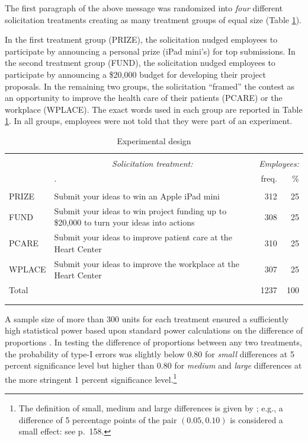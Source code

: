 \documentclass[12pt, titlepage]{article}
\begin{document}
The first paragraph of the above message was randomized into \emph{four}
different solicitation treatments creating as many treatment groups of
equal size (Table \ref{experimental-design}).

In the first treatment group (PRIZE), the solicitation nudged employees
to participate by announcing a personal prize (iPad mini's) for top
submissions. In the second treatment group (FUND), the solicitation
nudged employees to participate by announcing a \$20,000 budget for
developing their project proposals. In the remaining two groups, the
solicitation ``framed'' the contest as an opportunity to improve the
health care of their patients (PCARE) or the workplace (WPLACE). The
exact words used in each group are reported in Table
\ref{experimental-design}. In all groups, employees were not told that
they were part of an experiment.

\begin{table}
\centering
\caption{Experimental design}
\label{experimental-design}
\begin{tabular}{@{}lp{5cm}rr}
  \\[-1.8ex]\hline \hline \\[-1.8ex]
 & \multicolumn{1}{c}{\emph{Solicitation treatment:}}
                        & \multicolumn{2}{c}{\emph{Employees:}}\\
                        \cmidrule(lr){2-2}\cmidrule(lr){3-4} & . & freq. & \% \\ 
  \hline \\[-1.86ex]
PRIZE & Submit your ideas to win an Apple iPad mini & 312 & 25 \\ 
  [1.8ex] FUND & Submit your ideas to win project funding up to \$20,000 
            to turn your ideas into actions & 308 & 25 \\ 
  [1.8ex] PCARE & Submit your ideas to improve patient care at the Heart Center & 310 & 25 \\ 
  [1.8ex] WPLACE & Submit your ideas to improve the workplace at the Heart Center & 307 & 25 \\ 
  [1.8ex] Total &  & 1237 & 100 \\ 
   \\[-1.8ex]\hline \hline \\[-1.8ex]
\end{tabular}
\end{table}

A sample size of more than 300 units for each treatment ensured a
sufficiently high statistical power based upon standard power
calculations on the difference of proportions \citep{cohen1992power}. In
testing the difference of proportions between any two treatments, the
probability of type-I errors was slightly below \(0.80\) for
\emph{small} differences at 5 percent significance level but higher than
\(0.80\) for \emph{medium} and \emph{large} differences at the more
stringent 1 percent significance level.\footnote{The definition of
  small, medium and large differences is given by
  \citet{cohen1992power}; e.g., a difference of 5 percentage points of
  the pair \((0.05, 0.10)\) is considered a small effect: see
  \citet{cohen1992power} p.~158.}
\end{document}
